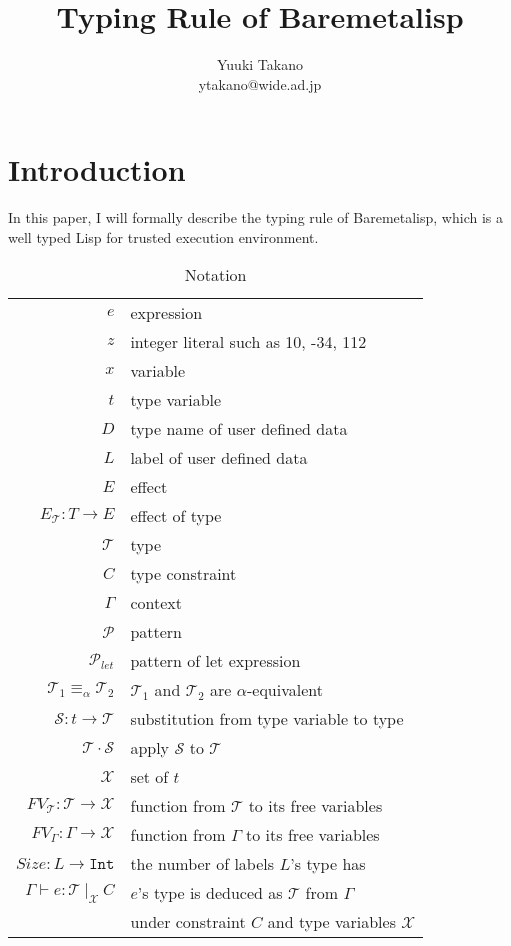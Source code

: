 \documentclass{article}
\title{Typing Rule of Baremetalisp}
\author{Yuuki Takano\\ ytakano@wide.ad.jp}
\begin{document}
\maketitle

\section{Introduction}

In this paper, I will formally describe the typing rule of Baremetalisp,
which is a well typed Lisp for trusted execution environment.

\begin{table}[tb]
    \centering
    \caption{Notation}
    \label{tab:notation}
    \begin{tabular}{rl}
        $e$ & expression \\
        $z$ & integer literal such as 10, -34, 112 \\
        $x$ & variable \\
        $t$ & type variable \\
        $D$ & type name of user defined data \\
        $L$ & label of user defined data \\
        $E$ & effect \\
        $E_\mathcal{T}: T \rightarrow E$ & effect of type \\
        $\mathcal{T}$ & type \\
        $C$ & type constraint \\
        $\Gamma$ & context \\
        $\mathcal{P}$ & pattern \\
        $\mathcal{P}_{let}$ & pattern of let expression \\
        $\mathcal{T}_1 \equiv_\alpha \mathcal{T}_2$ & $\mathcal{T}_1$ and $\mathcal{T}_2$ are $\alpha$-equivalent \\
        $\mathcal{S} : t \rightarrow \mathcal{T}$ & substitution from type variable to type\\
        $\mathcal{T} \cdot \mathcal{S}$ & apply $\mathcal{S}$ to $\mathcal{T}$ \\
        $\mathcal{X}$ & set of $t$ \\
        $FV_\mathcal{T} : \mathcal{T} \rightarrow \mathcal{X}$ & function from $\mathcal{T}$ to its free variables\\
        $FV_\Gamma : \Gamma \rightarrow \mathcal{X}$ & function from $\Gamma$ to its free variables\\
        $Size : L \rightarrow \mathtt{Int}$ & the number of labels $L$'s type has \\
        $\Gamma \vdash e : \mathcal{T}\ |_\mathcal{X}\ C$ & $e$'s type is deduced as $\mathcal{T}$ from $\Gamma$ \\
        & under constraint $C$ and type variables $\mathcal{X}$
    \end{tabular}
\end{table}
\end{document}

